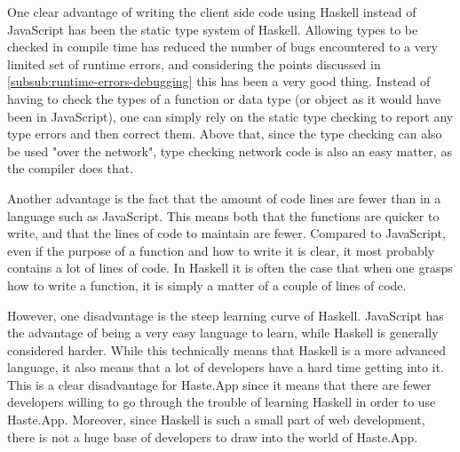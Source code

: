 \documentclass[a4paper]{article}
\begin{document}
One clear advantage of writing the client side code using Haskell instead of JavaScript has been the static type system of Haskell. Allowing types to be checked in compile time has reduced the number of bugs encountered to a very limited set of runtime errors, and considering the points discussed in \cref{subsub:runtime-errors-debugging} this has been a very good thing. Instead of having to check the types of a function or data type (or object as it would have been in JavaScript), one can simply rely on the static type checking to report any type errors and then correct them. Above that, since the type checking can also be used "over the network", type checking network code is also an easy matter, as the compiler does that. 

Another advantage is the fact that the amount of code lines are fewer than in a language such as JavaScript. This means both that the functions are quicker to write, and that the lines of code to maintain are fewer. Compared to JavaScript, even if the purpose of a function and how to write it is clear, it most probably contains a lot of lines of code. In Haskell it is often the case that when one grasps how to write a function, it is simply a matter of a couple of lines of code. 

However, one disadvantage is the steep learning curve of Haskell. JavaScript has the advantage of being a very easy language to learn, while Haskell is generally considered harder. While this technically means that Haskell is a more advanced language, it also means that a lot of developers have a hard time getting into it. This is a clear disadvantage for Haste.App since it means that there are fewer developers willing to go through the trouble of learning Haskell in order to use Haste.App. Moreover, since Haskell is such a small part of web development, there is not a huge base of developers to draw into the world of Haste.App. 
\end{document}
